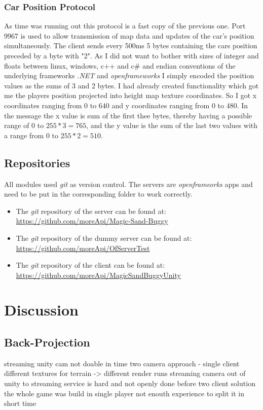 \documentclass[12pt,a4paper,twoside,titlepage,headsepline,numbers=noenddot,listof=totoc,index=totoc,bibliography=totoc]{scrartcl}
\theoremstyle{break}
\begin{document}
\subsubsection{Car Position Protocol}
As time was running out this protocol is a fast copy of the previous one. Port 9967 is used to allow transmission of map data and updates of the car's position simultaneously. The client sends every 500ms 5 bytes containing the cars position preceded by a byte with "2". As I did not want to bother with sizes of integer and floats between linux, windows, c++ and c\# and endian conventions of the underlying frameworks \textit{.NET} and \textit{openframeworks} I simply encoded the position values as the sums of 3 and 2 bytes. I had already created functionality which got me the players position projected into height map texture coordinates. So I got x coordinates ranging from 0 to 640 and y coordinates ranging from 0 to 480. In the message the x value is sum of the first thee bytes, thereby having a possible range of 0 to $255*3=765$, and the y value is the sum of the last two values with a range from 0 to $255*2=510$.

\subsection{Repositories}
All modules used \textit{git} as version control. The servers are \textit{openframeorks} apps and need to be put in the corresponding folder to work correctly.

\begin{itemize}
	\item The \textit{git} repository of the server can be found at:\\ \url{https://github.com/moreApi/Magic-Sand-Buggy}
	\item The \textit{git} repository of the dummy server can be found at:\\ \url{https://github.com/moreApi/OfServerTest}
	\item The \textit{git} repository of the client can be found at:\\ \url{https://github.com/moreApi/MagicSandBuggyUnity}
\end{itemize}

\section{Discussion}

\subsection{Back-Projection}
\label{ch:backProjection}
streaming unity cam not doable in time
two camera approach - single client
different textures for terrain -> different render runs
streaming camera out of unity to streaming service is hard and not openly done before
two client solution
the whole game was build in single player
not enouth experience to split it in short time
\end{document}
